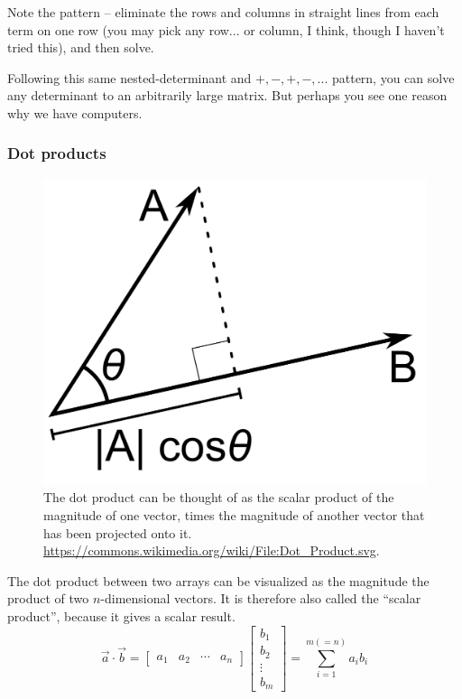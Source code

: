 \documentclass[a4paper,10pt]{scrartcl}
\begin{document}
Note the pattern -- eliminate the rows and columns in straight lines from each term on one row (you may pick any row... or column, I think, though I haven't tried this), and then solve.

Following this same nested-determinant and $+, -, +, -, ...$ pattern, you can solve any determinant to an arbitrarily large matrix. But perhaps you see one reason why we have computers.


\subsubsection{Dot products}

\begin{figure}[ht!]
\begin{center}
 \includegraphics[width=.5\linewidth]{figures/NumericalAndMath/Dot_Product.png}
\end{center}
 \caption{The dot product can be thought of as the scalar product of the magnitude of one vector, times the magnitude of another vector that has been projected onto it. \url{https://commons.wikimedia.org/wiki/File:Dot_Product.svg}.}
\end{figure}


The dot product between two arrays can be visualized as the magnitude the product of two $n$-dimensional vectors. It is therefore also called the ``scalar product'', because it gives a scalar result.
\begin{equation}
 \vec{a} \cdot \vec{b} =
 \begin{bmatrix}
  a_{1} & a_{2} & \cdots & a_{n}
 \end{bmatrix}
 \begin{bmatrix}
  b_{1} \\
  b_{2} \\
  \vdots \\
  b_{m}
 \end{bmatrix}
 = \sum_{i=1}^{m(=n)} a_i b_i
\end{equation}
\end{document}
